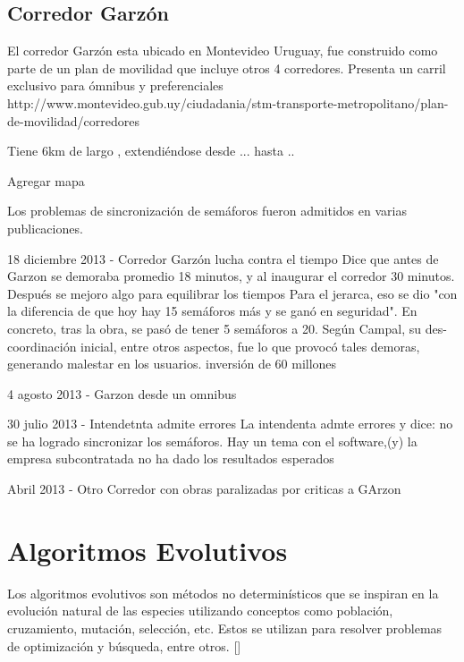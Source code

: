 \subsection{Corredor Garzón}
El corredor Garzón esta ubicado en Montevideo Uruguay, fue construido como parte de un plan de movilidad que incluye otros 4 corredores. 
Presenta un carril exclusivo para ómnibus y preferenciales
http://www.montevideo.gub.uy/ciudadania/stm-transporte-metropolitano/plan-de-movilidad/corredores

Tiene 6km de largo , extendiéndose desde ...  hasta ..

Agregar mapa

Los problemas de sincronización de semáforos fueron admitidos en varias publicaciones.

18 diciembre 2013 - Corredor Garzón lucha contra el tiempo %
Dice que antes de Garzon se demoraba promedio 18 minutos, y al inaugurar el corredor 30 minutos. Después se mejoro algo para equilibrar los tiempos
Para el jerarca, eso se dio "con la diferencia de que hoy hay 15 semáforos más y se ganó en seguridad". En concreto, tras la obra, se pasó de tener 5 semáforos a 20. Según Campal, su des-coordinación inicial, entre otros aspectos, fue lo que provocó tales demoras, generando malestar en los usuarios.
inversión de 60 millones


4 agosto 2013 - Garzon desde un omnibus %


30 julio 2013  - Intendetnta admite errores %
La intendenta admte errores y dice: no se ha logrado sincronizar los semáforos. Hay un tema con el software,(y) la empresa subcontratada no ha dado los resultados esperados


Abril 2013 - Otro Corredor con obras paralizadas por criticas a GArzon





\section{Algoritmos Evolutivos}
Los algoritmos evolutivos son métodos no determinísticos que se inspiran en la evolución natural de las especies utilizando conceptos como población, cruzamiento, mutación, selección, etc. Estos se utilizan para resolver problemas de optimización y búsqueda, entre otros. []

